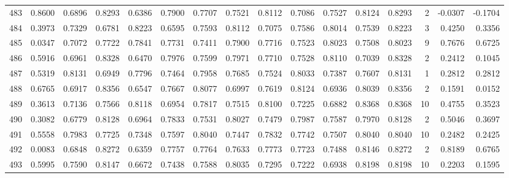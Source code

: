 \begin{tabular}{lrrrrrrrrrrrrrrr}
483 &      0.8600 &  0.6896 &  0.8293 &  0.6386 &  0.7900 &  0.7707 &  0.7521 &  0.8112 &  0.7086 &  0.7527 &   0.8124 &     0.8293 &      2 &                   -0.0307 &                    -0.1704 \\
484 &      0.3973 &  0.7329 &  0.6781 &  0.8223 &  0.6595 &  0.7593 &  0.8112 &  0.7075 &  0.7586 &  0.8014 &   0.7539 &     0.8223 &      3 &                    0.4250 &                     0.3356 \\
485 &      0.0347 &  0.7072 &  0.7722 &  0.7841 &  0.7731 &  0.7411 &  0.7900 &  0.7716 &  0.7523 &  0.8023 &   0.7508 &     0.8023 &      9 &                    0.7676 &                     0.6725 \\
486 &      0.5916 &  0.6961 &  0.8328 &  0.6470 &  0.7976 &  0.7599 &  0.7971 &  0.7710 &  0.7528 &  0.8110 &   0.7039 &     0.8328 &      2 &                    0.2412 &                     0.1045 \\
487 &      0.5319 &  0.8131 &  0.6949 &  0.7796 &  0.7464 &  0.7958 &  0.7685 &  0.7524 &  0.8033 &  0.7387 &   0.7607 &     0.8131 &      1 &                    0.2812 &                     0.2812 \\
488 &      0.6765 &  0.6917 &  0.8356 &  0.6547 &  0.7667 &  0.8077 &  0.6997 &  0.7619 &  0.8124 &  0.6936 &   0.8039 &     0.8356 &      2 &                    0.1591 &                     0.0152 \\
489 &      0.3613 &  0.7136 &  0.7566 &  0.8118 &  0.6954 &  0.7817 &  0.7515 &  0.8100 &  0.7225 &  0.6882 &   0.8368 &     0.8368 &     10 &                    0.4755 &                     0.3523 \\
490 &      0.3082 &  0.6779 &  0.8128 &  0.6964 &  0.7833 &  0.7531 &  0.8027 &  0.7479 &  0.7987 &  0.7587 &   0.7970 &     0.8128 &      2 &                    0.5046 &                     0.3697 \\
491 &      0.5558 &  0.7983 &  0.7725 &  0.7348 &  0.7597 &  0.8040 &  0.7447 &  0.7832 &  0.7742 &  0.7507 &   0.8040 &     0.8040 &     10 &                    0.2482 &                     0.2425 \\
492 &      0.0083 &  0.6848 &  0.8272 &  0.6359 &  0.7757 &  0.7764 &  0.7633 &  0.7773 &  0.7723 &  0.7488 &   0.8146 &     0.8272 &      2 &                    0.8189 &                     0.6765 \\
493 &      0.5995 &  0.7590 &  0.8147 &  0.6672 &  0.7438 &  0.7588 &  0.8035 &  0.7295 &  0.7222 &  0.6938 &   0.8198 &     0.8198 &     10 &                    0.2203 &                     0.1595 \\

\end{tabular}
